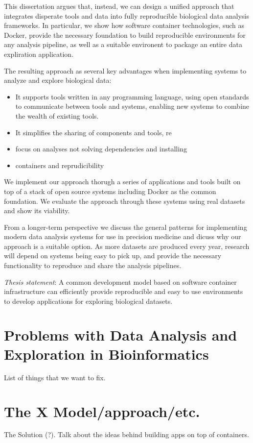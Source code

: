 This dissertation argues that, instead, we can design a unified approach that
integrates disperate tools and data into fully reproducible biological data
analysis frameworks.  In particular, we show how software container
technologies, such as Docker, provide the necessary foundation to build
reproducible environments for any analysis pipeline, as well as a suitable
environent to package an entire data expliration application. 

The resulting approach as several key advantages when implementing systems to
analyze and explore biological data:
\begin{itemize} 
    \item It supports tools written in any programming language, using open
        standards to communicate between tools and systems, enabling new systems
        to combine the wealth of existing tools. 
    \item It simplifies the sharing of components and tools, re
    \item focus on analyses not solving dependencies and installing
    \item containers and reprudicibility
\end{itemize} 

We implement our approach thorugh a series of applications and tools built on
top of a stack of open source systems including Docker as the common foundation.
We evaluate the approach through these systems using real datasets and show its
viability. 

From a longer-term perspective we discuss the general patterns for implementing
modern data analysis systems for use in precision medicine and dicuss why our
approach is a suitable option. As more datasets are produced every year,
research will depend on systems being easy to pick up, and provide the necessary
functionality to reproduce and share the analysis pipelines. 

\emph{Thesis statement}:
A common development model based on software container infrastructure can
efficiently provide reproducible and easy to use environments to develop
applications for exploring biological datasets. 

\section{Problems with Data Analysis and Exploration in Bioinformatics} 
    List of things that we want to fix. 

\section{The X Model/approach/etc.} 
    The Solution (?). Talk about the ideas behind building apps on top of
    containers.  

